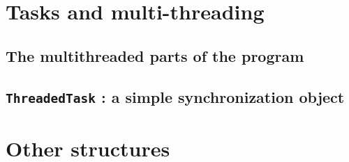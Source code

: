 \section{Tasks and multi-threading}\label{text:03_software_components:04_tasks}
{

	\subsection{The multithreaded parts of the program}
	{
	}

	\subsection{\texttt{ThreadedTask} : a simple synchronization object}
	{
	}
}

\section{Other structures}\label{text:03_software_components:05_other}
{
}

